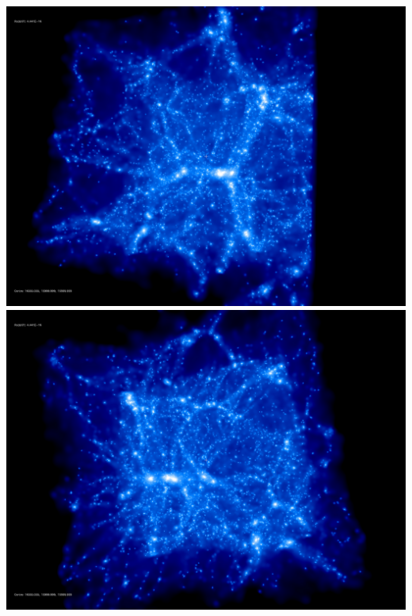\includegraphics[scale=0.1]{NGenIC_15039/rotate_00074.jpg} 
\includegraphics[scale=0.1]{NGenIC_15039/rotate_00131.jpg}

